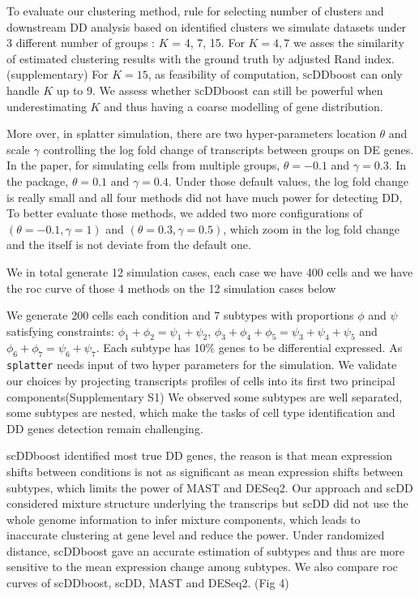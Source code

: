 \documentclass[aoas,preprint]{imsart}
\begin{document}
To evaluate our clustering method, rule for selecting number of clusters and downstream DD analysis based on identified clusters we simulate datasets under 3 different number of groups : $K$ =  4, 7, 15.  For $K = 4, 7$ we asses 
the similarity of estimated clustering results with the ground truth by adjusted Rand index. (supplementary)  For $K = 15$, as feasibility of computation, \textsc scDDboost can only handle $K$ up to 9. We assess whether \textsc scDDboost 
can still be powerful when underestimating $K$ and thus having a coarse modelling of gene distribution.

More over, in splatter simulation, there are two hyper-parameters location $\theta$ and scale $\gamma$ controlling the log fold change of transcripts between groups on DE genes. In the paper, for simulating cells from multiple groups, $\theta = -0.1$ and $\gamma = 0.3$. 
In the package, $\theta = 0.1$ and $\gamma = 0.4$. Under those default values, the log fold change is really small and all four methods did not have much power for detecting DD, To better evaluate those methods, we added two more configurations of $(\theta = -0.1, \gamma = 1)$ and $(\theta = 0.3, \gamma = 0.5)$, which zoom in the log fold change and the itself is not deviate from the default one. 

We in total generate 12 simulation cases, each case we have 400 cells and we have the roc curve of those 4 methods on the 12 simulation cases below
 
We generate 200 cells each condition 
and 7 subtypes with proportions $\phi$ and $\psi$ satisfying constraints: $\phi_1 + \phi_2 = \psi_1 + \psi_2$, $\phi_3 + \phi_4 +\phi_5 = \psi_3 + \psi_4 + \psi_5$ and $\phi_6 + \phi_7 = \psi_6 + \psi_7$. 
Each subtype has 10\% genes to be differential expressed. 
As \verb+splatter+ needs input of two hyper parameters for the simulation. We validate our choices by projecting transcripts profiles of cells into its first two principal components(Supplementary S1)
We observed some subtypes are well separated, some subtypes are nested, which make the tasks of cell type identification and DD genes detection remain challenging. 



scDDboost identified most true DD genes, the reason is that mean expression shifts between conditions is not as significant as mean expression shifts between subtypes, which limits the power of MAST and DESeq2. Our approach and scDD considered mixture structure underlying the transcrips but scDD did not use the whole genome information to infer mixture components, which leads to inaccurate clustering at gene level and reduce the power. Under randomized distance, scDDboost gave an accurate estimation of subtypes and thus are more sensitive to the mean expression change among subtypes. We also compare roc curves of scDDboost, scDD, MAST and DESeq2. (Fig 4)
\end{document}
